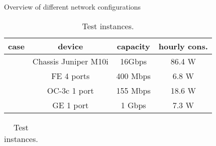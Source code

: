 \documentclass[final,5p,times,twocolumn]{elsarticle}
\begin{document}
\begin{table}[!htc]
  \centering
  \caption{Overview of different network configurations}\label{tab_card_device}
  \begin{tabular}{c|c|c c}
    \hline 
case & device       & capacity  & hourly cons. \\ 
          \hline
           & Chassis Juniper M10i & 16Gbps & 86.4 W\\
          \hline
     & FE 4 ports   & 400 Mbps  & 6.8 W \\
     & OC-3c 1 port & 155 Mbps  & 18.6 W\\
       & GE 1 port    & 1 Gbps    & 7.3 W\\
    \hline 
  \end{tabular}

\vspace{0.5cm}
\footnotesize
\tabcolsep 5pt
\caption{Test instances.}
\begin{center}
\begin{tabular}{ccccccc}

\hline


\end{tabular}
\end{center}
\end{table}
\end{document}
